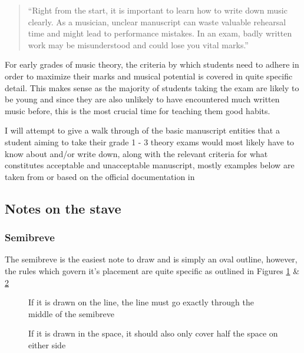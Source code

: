 \blockquote{``Right from the start, it is important to learn how to write down music clearly. As a musician, unclear manuscript can waste valuable rehearsal time and might lead to performance mistakes. In an exam, badly written work may be misunderstood and could lose you vital marks.'' \cite{taylor1989ab}}


For early grades of music theory, the criteria by which students need to adhere in order to maximize their marks and musical potential is covered in quite specific detail. This makes sense as the majority of students taking the exam are likely to be young and since they are also unlikely to have encountered much written music before, this is the most crucial time for teaching them good habits.

I will attempt to give a walk through of the basic manuscript entities that a student aiming to take their grade 1 - 3 theory exams would most likely have to know about and/or write down, along with the relevant criteria for what constitutes acceptable and unacceptable manuscript, mostly examples below are taken from or based on the official documentation in \cite{taylor2008music}


\subsection*{Notes on the stave}

\subsubsection*{Semibreve}

The semibreve is the easiest note to draw and is simply an oval outline, however, the rules which govern it's placement are quite specific as outlined in Figures \ref{fig:SemibreveOnLine} \& \ref{fig:SemibreveOnSpace}

\begin{figure}[h!]
  \centering
  \caption{If it is drawn on the line, the line must go exactly through the middle of the semibreve}
  \label{fig:SemibreveOnLine}
\end{figure}

\begin{figure}[h!]
  \centering
  \caption{If it is drawn in the space, it should also only cover half the space on either side}
  \label{fig:SemibreveOnSpace}
\end{figure}

